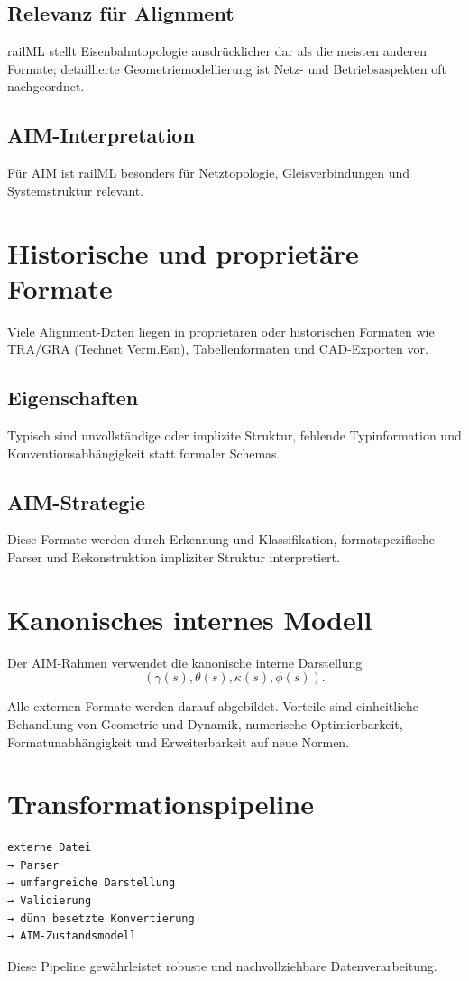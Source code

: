 \subsection{Relevanz für Alignment}
railML stellt Eisenbahntopologie ausdrücklicher dar als die meisten anderen
Formate; detaillierte Geometriemodellierung ist Netz- und Betriebsaspekten oft
nachgeordnet.

\subsection{AIM-Interpretation}
Für AIM ist railML besonders für Netztopologie, Gleisverbindungen und
Systemstruktur relevant.

\section{Historische und proprietäre Formate}
Viele Alignment-Daten liegen in proprietären oder historischen Formaten wie
TRA/GRA (Technet Verm.Esn), Tabellenformaten und CAD-Exporten vor.

\subsection{Eigenschaften}
Typisch sind unvollständige oder implizite Struktur, fehlende Typinformation
und Konventionsabhängigkeit statt formaler Schemas.

\subsection{AIM-Strategie}
Diese Formate werden durch Erkennung und Klassifikation, formatspezifische
Parser und Rekonstruktion impliziter Struktur interpretiert.

\section{Kanonisches internes Modell}
\begin{definition}
Der AIM-Rahmen verwendet die kanonische interne Darstellung
\[
(\gamma(s),\theta(s),\kappa(s),\phi(s)).
\]
\end{definition}
Alle externen Formate werden darauf abgebildet. Vorteile sind einheitliche
Behandlung von Geometrie und Dynamik, numerische Optimierbarkeit,
Formatunabhängigkeit und Erweiterbarkeit auf neue Normen.

\section{Transformationspipeline}
\begin{verbatim}
externe Datei
→ Parser
→ umfangreiche Darstellung
→ Validierung
→ dünn besetzte Konvertierung
→ AIM-Zustandsmodell
\end{verbatim}
Diese Pipeline gewährleistet robuste und nachvollziehbare Datenverarbeitung.


